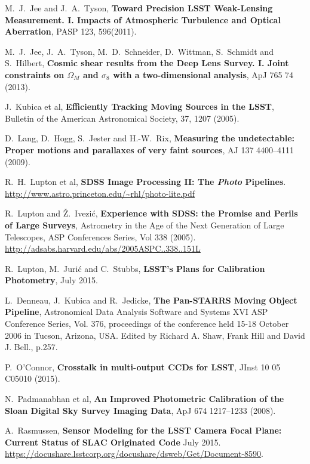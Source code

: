 \documentclass[DM,lsstdraft,SDD]{lsstdoc}
\begin{document}
\begin{thebibliography}{10}
 M.~J.~Jee and J.~A.~Tyson,  \textbf{Toward
  Precision LSST Weak-Lensing Measurement. I. Impacts of Atmospheric
  Turbulence and Optical Aberration}, PASP 123, 596(2011).

 M.~J.~Jee, J.~A.~Tyson, M.~D.~Schneider, D.~Wittman, S.~Schmidt and S.~Hilbert,
  \textbf{Cosmic shear results from the Deep Lens Survey. I. Joint constraints on $\Omega_M$ and $\sigma_8$ with a two-dimensional analysis},
  ApJ 765 74 (2013).

 J.~Kubica et al,
  \textbf{Efficiently Tracking Moving Sources in the LSST},
  Bulletin of the American Astronomical Society, 37, 1207 (2005).

 D.~Lang, D.~Hogg, S.~Jester and H.-W.~Rix,
  \textbf{Measuring the undetectable: Proper motions and parallaxes of very faint sources},
  AJ 137 4400--4111 (2009).

 R.~H.~Lupton et al,
  \textbf{SDSS Image Processing II: The \textit{Photo} Pipelines}.
  \url{http://www.astro.princeton.edu/~rhl/photo-lite.pdf}

 R.~Lupton and \v{Z}.~Ivezi\'c, \textbf{Experience with SDSS: the Promise and Perils of Large Surveys},
  Astrometry in the Age of the Next Generation of Large Telescopes, ASP
  Conferences Series, Vol 338 (2005). \url{http://adsabs.harvard.edu/abs/2005ASPC..338..151L}

 R.~Lupton, M.~Juri\'c and C.~Stubbs,
  \textbf{LSST's Plans for Calibration Photometry},
  July 2015.

 L.~Denneau, J.~Kubica and R.~Jedicke,
   \textbf{The Pan-STARRS Moving Object Pipeline}, Astronomical Data
  Analysis Software and Systems XVI ASP Conference Series, Vol. 376,
  proceedings of the conference held 15-18 October 2006 in Tucson,
  Arizona, USA\@. Edited by Richard A. Shaw, Frank Hill and David
  J. Bell., p.257.

 P.~O'Connor,
\textbf{Crosstalk in multi-output {CCDs} for {LSST}},
JInst 10 05 C05010 (2015).

 N.~Padmanabhan et al,
  \textbf{An Improved Photometric Calibration of the Sloan Digital Sky Survey Imaging Data},
  ApJ 674 1217--1233 (2008).

 A.~Rasmussen,
  \textbf{Sensor Modeling for the LSST Camera Focal Plane: Current Status of SLAC Originated Code}
  July 2015. \url{https://docushare.lsstcorp.org/docushare/dsweb/Get/Document-8590}.


\end{thebibliography}
\end{document}
